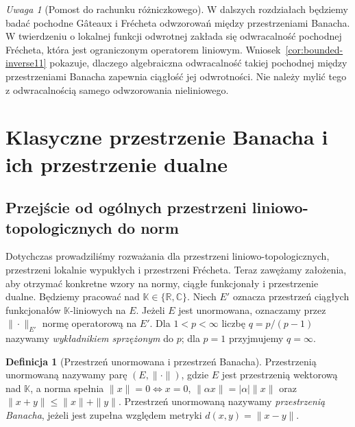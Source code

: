 \documentclass[11pt,a4paper]{article}
\numberwithin{equation}{section}
\theoremstyle{plain}
\theoremstyle{definition}
\newtheorem{definicja}[twierdzenie]{Definicja}
\theoremstyle{remark}
\newtheorem{uwaga}[twierdzenie]{Uwaga}
\newcommand{\R}{\mathbb R}
\newcommand{\C}{\mathbb C}
\newcommand{\K}{\mathbb K}
\begin{document}
\begin{uwaga}[Pomost do rachunku różniczkowego]
W dalszych rozdziałach będziemy badać pochodne Gâteaux
i Frécheta odwzorowań między przestrzeniami Banacha.
W twierdzeniu o lokalnej funkcji odwrotnej zakłada się
odwracalność pochodnej Frécheta, która jest ograniczonym
operatorem liniowym. Wniosek~\ref{cor:bounded-inverse11}
pokazuje, dlaczego algebraiczna odwracalność takiej
pochodnej między przestrzeniami Banacha zapewnia
ciągłość jej odwrotności. Nie należy mylić tego z
odwracalnością samego odwzorowania nieliniowego.
\end{uwaga}


\setcounter{section}{11}
\section{Klasyczne przestrzenie Banacha i ich przestrzenie dualne}
\label{sec:klasyczne-banach12}

\subsection{Przejście od ogólnych przestrzeni liniowo-topologicznych do norm}

Dotychczas prowadziliśmy rozważania dla przestrzeni liniowo-topologicznych,
przestrzeni lokalnie wypukłych i przestrzeni Frécheta. Teraz zawężamy
założenia, aby otrzymać konkretne wzory na normy, ciągłe funkcjonały
i przestrzenie dualne. Będziemy pracować nad $\K\in\{\R,\C\}$.
Niech $E'$ oznacza przestrzeń ciągłych funkcjonałów $\K$-liniowych na $E$.
Jeżeli $E$ jest unormowana, oznaczamy przez $\|\cdot\|_{E'}$ normę
operatorową na $E'$. Dla $1<p<\infty$ liczbę $q=p/(p-1)$ nazywamy
\emph{wykładnikiem sprzężonym} do $p$; dla $p=1$ przyjmujemy $q=\infty$.

\begin{definicja}[Przestrzeń unormowana i przestrzeń Banacha]
\label{def:banach12}
Przestrzenią unormowaną nazywamy parę $(E,\|\cdot\|)$, gdzie $E$
jest przestrzenią wektorową nad $\K$, a norma spełnia
$\|x\|=0\iff x=0$, $\|\alpha x\|=|\alpha|\|x\|$ oraz
$\|x+y\|\le\|x\|+\|y\|$. Przestrzeń unormowaną nazywamy
\emph{przestrzenią Banacha}, jeżeli jest zupełna względem metryki
$d(x,y)=\|x-y\|$.
\end{definicja}
\end{document}
